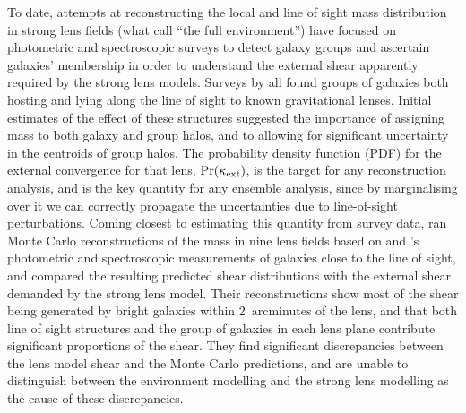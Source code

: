 \documentclass[useAMS,usenatbib]{mn2e}
\begin{document}
To date, attempts at reconstructing the local and line of sight mass
distribution in strong lens fields (what \citeauthor{WongEtal2011} call ``the
full environment'') have focused on photometric and  spectroscopic surveys to
detect galaxy groups and ascertain galaxies' membership in order to understand
the external shear apparently required by the strong lens models. Surveys by
\citet{Fassnacht+Lubin2002,AugerEtal2007,WilliamsEtal2006,MomchevaEtal2006}
all found groups of galaxies both hosting and lying  along the line of sight
to known gravitational lenses. Initial estimates of the effect of these
structures suggested the importance of assigning mass to both galaxy and group
halos, and to allowing for significant uncertainty in the centroids of group
halos. The probability density function (PDF) for the external convergence for
that lens, ${\rm Pr}(\kappa_{\rm ext})$, is the target for any reconstruction analysis, and
is the key quantity for any ensemble analysis, since by marginalising over it
we can correctly propagate the uncertainties due to line-of-sight perturbations. Coming
closest to estimating this quantity from survey data, \citet{WongEtal2011} ran
Monte Carlo reconstructions of the mass in nine lens fields based on
\citeauthor{WilliamsEtal2006} and \citeauthor{MomchevaEtal2006}'s
photometric and spectroscopic measurements of galaxies close to the line of
sight, and compared the resulting predicted shear distributions with the
external shear demanded by the strong lens model. Their reconstructions show most
of the shear being generated by bright galaxies within 2~arcminutes of the
lens, and that both line of sight structures and the group of galaxies in each
lens plane contribute significant proportions of the shear. They find
significant discrepancies between the lens model shear and the Monte Carlo
predictions, and are unable to distinguish between the environment modelling
and the strong lens modelling as the cause of these discrepancies.
\end{document}
